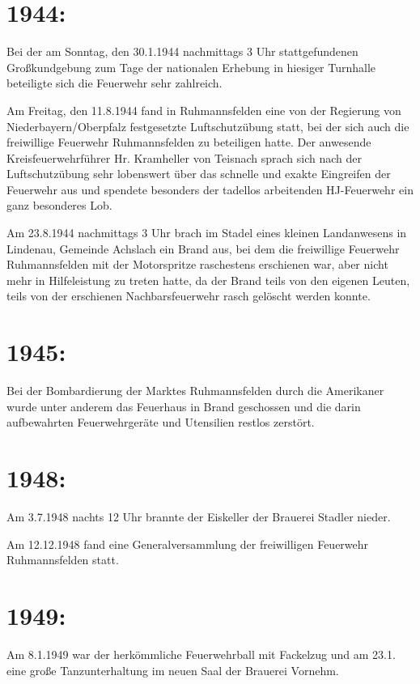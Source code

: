 \documentclass[12pt,a4paper]{book}
\begin{document}
\section{1944:}

Bei der am Sonntag, den 30.1.1944 nachmittags 3 Uhr stattgefundenen
Großkundgebung zum Tage der nationalen Erhebung in hiesiger Turnhalle beteiligte
sich die Feuerwehr sehr zahlreich.

Am Freitag, den 11.8.1944 fand in Ruhmannsfelden eine von der Regierung von
Niederbayern/Oberpfalz festgesetzte Luftschutzübung statt, bei der sich auch die
freiwillige Feuerwehr Ruhmannsfelden zu beteiligen hatte. Der anwesende
Kreisfeuerwehrführer Hr. Kramheller von Teisnach sprach sich nach der
Luftschutzübung sehr lobenswert über das schnelle und exakte Eingreifen der
Feuerwehr aus und spendete besonders der tadellos arbeitenden HJ-Feuerwehr ein
ganz besonderes Lob.

Am 23.8.1944 nachmittags 3 Uhr brach im Stadel eines kleinen Landanwesens in
Lindenau, Gemeinde Achslach ein Brand aus, bei dem die freiwillige Feuerwehr
Ruhmannsfelden mit der Motorspritze raschestens erschienen war, aber nicht mehr
in Hilfeleistung zu treten hatte, da der Brand teils von den eigenen Leuten,
teils von der erschienen Nachbarsfeuerwehr rasch gelöscht werden konnte.

\section{1945:}

Bei der Bombardierung der Marktes Ruhmannsfelden durch die Amerikaner wurde
unter anderem das Feuerhaus in Brand geschossen und die darin aufbewahrten
Feuerwehrgeräte und Utensilien restlos zerstört.

\section{1948:}

Am 3.7.1948 nachts 12 Uhr brannte der Eiskeller der Brauerei Stadler nieder.

Am 12.12.1948 fand eine Generalversammlung der freiwilligen Feuerwehr
Ruhmannsfelden statt.

\section{1949:}

Am 8.1.1949 war der herkömmliche Feuerwehrball mit Fackelzug und am 23.1. eine
große Tanzunterhaltung im neuen Saal der Brauerei Vornehm.
\end{document}
